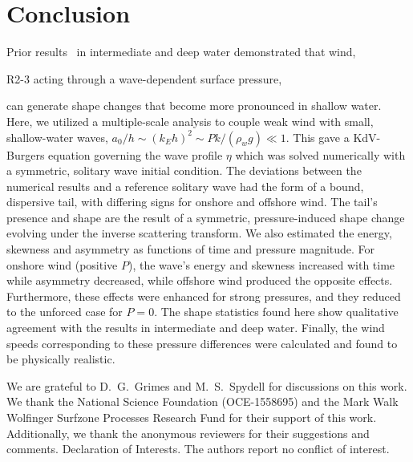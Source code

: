 \documentclass{jfm}
\begin{document}
\section{Conclusion}
Prior results~\citep{zdyrski2020wind} in intermediate and deep water
demonstrated that wind,
\begin{LineLabel}{R2-3}
acting through a wave-dependent surface pressure,
\end{LineLabel}
can generate shape changes that become more pronounced in
shallow water.
Here, we utilized a multiple-scale analysis to couple weak wind with
small, shallow-water waves, \ie{} $a_0/h \sim (k_E h)^2 \sim P k/(\rho_w
g) \ll 1$.
This gave a KdV-Burgers equation governing the wave profile $\eta$
which was solved numerically with a symmetric, solitary wave initial
condition.
The deviations between the numerical results and a reference solitary
wave had the form of a bound, dispersive tail, with differing signs for
onshore and offshore wind.
The tail's presence and shape are the result of a symmetric,
pressure-induced shape change evolving under the inverse scattering
transform.
We also estimated the energy, skewness and
asymmetry as functions of time and pressure magnitude.
For onshore wind (positive $P$), the wave's energy and skewness
increased with time while asymmetry decreased, while offshore wind
produced the opposite effects.
Furthermore, these effects were enhanced for strong pressures, and they
reduced to the unforced case for $P=0$.
The shape statistics found here show qualitative agreement with the
results in intermediate and deep water.
Finally, the wind speeds corresponding to these pressure differences
were calculated and found to be physically realistic.

\begin{acknowledgements}
We are grateful to D.~G.~Grimes and M.~S.~Spydell for discussions on
this work.
We thank the National Science Foundation (OCE-1558695) and the Mark Walk
Wolfinger Surfzone Processes Research Fund for their support of this
work.
Additionally, we thank the anonymous reviewers for their suggestions and
comments.
Declaration of Interests. The authors report no conflict of interest.
\end{acknowledgements}



\end{document}
